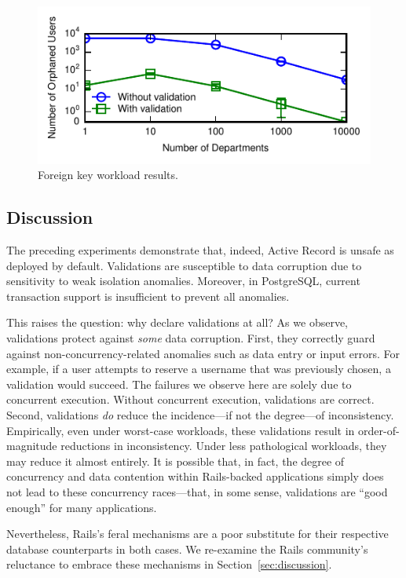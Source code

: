 \begin{figure}
\includegraphics[width=\columnwidth]{figs/fk-workload-violations.pdf}\vspace{-1em}
\caption{Foreign key workload results.}
\label{fig:fk-workload}
\end{figure}

\subsection{Discussion}

The preceding experiments demonstrate that, indeed, Active Record is
unsafe as deployed by default. Validations are susceptible to data
corruption due to sensitivity to weak isolation anomalies. Moreover,
in PostgreSQL, current transaction support is insufficient to prevent
all anomalies.

This raises the question: why declare validations at all? As we
observe, validations protect against \textit{some} data
corruption. First, they correctly guard against
non-concurrency-related anomalies such as data entry or input
errors. For example, if a user attempts to reserve a username that was
previously chosen, a validation would succeed. The failures we observe
here are solely due to concurrent execution. Without concurrent
execution, validations are correct. Second, validations
\textit{do} reduce the incidence---if not the degree---of
inconsistency. Empirically, even under worst-case workloads, these
validations result in order-of-magnitude reductions in
inconsistency. Under less pathological workloads, they may reduce it
almost entirely. It is possible that, in fact, the degree of
concurrency and data contention within Rails-backed applications
simply does not lead to these concurrency races---that, in some sense,
validations are ``good enough'' for many applications.

Nevertheless, Rails's feral mechanisms are a poor substitute for their
respective database counterparts in both cases. We re-examine the Rails community's
reluctance to embrace these mechanisms in Section~\ref{sec:discussion}.


